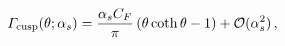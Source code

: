 \begin{equation}
\label{GammaCusp}
{\mit\Gamma}_{\rm cusp} (\theta; \alpha_s) =
\frac{\alpha_s C_F}{\pi}
\left( \theta \coth \theta - 1 \right)
+ \mathcal{O}(\alpha_s^2)
\, ,
\end{equation}

